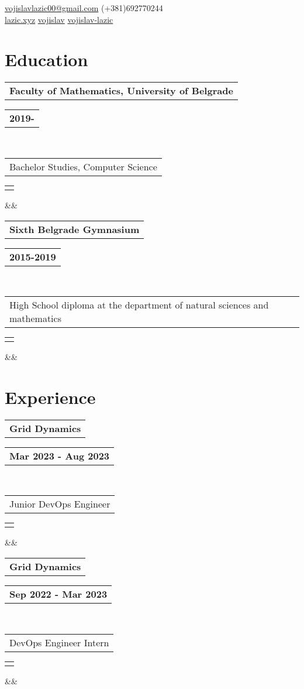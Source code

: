 \documentclass[11pt,a4paper,roman]{moderncv}        %
\makeatletter
\newcommand*{\customcventry}[7][.25em]{
  \begin{tabular}{@{}l}
    {\bfseries #4}
  \end{tabular}
  \hfill%
  \begin{tabular}{l@{}}
     {\bfseries #5}
  \end{tabular} \\
  \begin{tabular}{@{}l}
    {#3}
  \end{tabular}
  \hfill%
  \begin{tabular}{l@{}}
     {\itshape #2}
  \end{tabular}
  \ifx&#7&%
  \else{\\%
    \begin{minipage}{\maincolumnwidth}%
      \small#7%
    \end{minipage}}\fi%
  \par\addvspace{#1}}
\makeatother
\begin{document}
\makecvtitle
\vspace*{-17mm}

\begin{center}
	\faEnvelopeO\enspace \href{mail:vojislavlazic00@gmail.com}{vojislavlazic00@gmail.com} \enspace \faMobile\enspace (+381)692770244 \\
	\faGlobe\enspace \href{https://lazic.xyz}{lazic.xyz} \enspace
	\faGithub\enspace \href{https://github.com/vojislav}{vojislav} \enspace
	\faLinkedinSquare\enspace \href{https://www.linkedin.com/in/vojislav-lazic/}{vojislav-lazic}
\end{center}

\section{Education}
{\customcventry{}{Bachelor Studies, Computer Science}{Faculty of Mathematics, University of Belgrade}{2019-}{}{}}
{\customcventry{}{High School diploma at the department of natural sciences and mathematics}{Sixth Belgrade Gymnasium}{2015-2019}{}{}}


\section{Experience}
{\customcventry{}{Junior DevOps Engineer}{Grid Dynamics}{Mar 2023 - Aug 2023}{}{}}
{\customcventry{}{DevOps Engineer Intern}{Grid Dynamics}{Sep 2022 - Mar 2023}{}{}}
\end{document}
